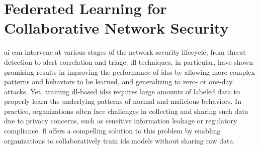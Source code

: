 \documentclass[conference]{IEEEtran}
\makeatletter
\DeclareRobustCommand\onedot{\futurelet\@let@token\@onedot}
\def\@onedot{\ifx\@topicslet@token.\else.\null\fi\xspace}
\def\eg{\emph{e.g}\onedot} \def\Eg{\emph{E.g}\onedot}
\makeatother
\begin{document}



\section{Federated Learning for Collaborative Network Security} %
\label{sec:fids}



\Gls{ai} can intervene at various stages of the network security lifecycle, from threat detection to alert correlation and triage.
\Gls{dl} techniques, in particular, have shown promising results in improving the performance of \glspl{ids} by allowing more complex patterns and behaviors to be learned, and generalizing to zero- or one-day attacks.
Yet, training \gls{dl}-based \glspl{ids} requires large amounts of labeled data to properly learn the underlying patterns of normal and malicious behaviors.
In practice, organizations often face challenges in collecting and sharing such data due to privacy concerns, such as sensitive information leakage or regulatory compliance.
\Gls{fl} offers a compelling solution to this problem by enabling organizations to collaboratively train \gls{ids} models without sharing raw data.
\end{document}
